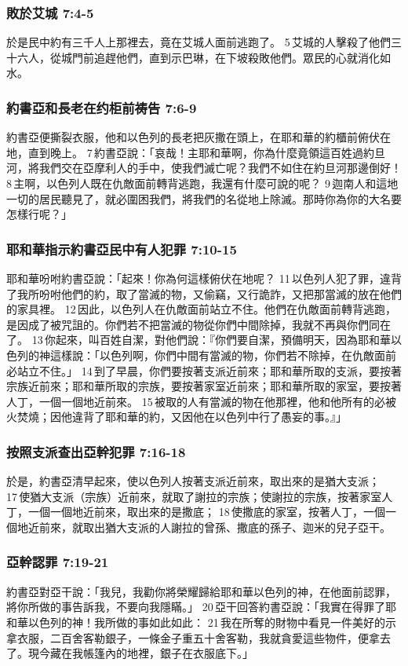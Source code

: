 \subsubsection{敗於艾城 7:4-5}
於是民中約有三千人上那裡去，竟在艾城人面前逃跑了。 5 艾城的人擊殺了他們三十六人，從城門前追趕他們，直到示巴琳，在下坡殺敗他們。眾民的心就消化如水。

\subsubsection{約書亞和長老在约柜前祷告 7:6-9}
約書亞便撕裂衣服，他和以色列的長老把灰撒在頭上，在耶和華的約櫃前俯伏在地，直到晚上。 7 約書亞說：「哀哉！主耶和華啊，你為什麼竟領這百姓過約旦河，將我們交在亞摩利人的手中，使我們滅亡呢？我們不如住在約旦河那邊倒好！ 8 主啊，以色列人既在仇敵面前轉背逃跑，我還有什麼可說的呢？ 9 迦南人和這地一切的居民聽見了，就必圍困我們，將我們的名從地上除滅。那時你為你的大名要怎樣行呢？」

\subsubsection{耶和華指示約書亞民中有人犯罪 7:10-15}
耶和華吩咐約書亞說：「起來！你為何這樣俯伏在地呢？ 11 以色列人犯了罪，違背了我所吩咐他們的約，取了當滅的物，又偷竊，又行詭詐，又把那當滅的放在他們的家具裡。 12 因此，以色列人在仇敵面前站立不住。他們在仇敵面前轉背逃跑，是因成了被咒詛的。你們若不把當滅的物從你們中間除掉，我就不再與你們同在了。 13 你起來，叫百姓自潔，對他們說：『你們要自潔，預備明天，因為耶和華以色列的神這樣說：「以色列啊，你們中間有當滅的物，你們若不除掉，在仇敵面前必站立不住。」 14 到了早晨，你們要按著支派近前來；耶和華所取的支派，要按著宗族近前來；耶和華所取的宗族，要按著家室近前來；耶和華所取的家室，要按著人丁，一個一個地近前來。 15 被取的人有當滅的物在他那裡，他和他所有的必被火焚燒；因他違背了耶和華的約，又因他在以色列中行了愚妄的事。』」


\subsubsection{按照支派查出亞幹犯罪 7:16-18}
於是，約書亞清早起來，使以色列人按著支派近前來，取出來的是猶大支派； 17 使猶大支派（宗族）近前來，就取了謝拉的宗族；使謝拉的宗族，按著家室人丁，一個一個地近前來，取出來的是撒底； 18 使撒底的家室，按著人丁，一個一個地近前來，就取出猶大支派的人謝拉的曾孫、撒底的孫子、迦米的兒子亞干。

\subsubsection{亞幹認罪 7:19-21}
約書亞對亞干說：「我兒，我勸你將榮耀歸給耶和華以色列的神，在他面前認罪，將你所做的事告訴我，不要向我隱瞞。」 20 亞干回答約書亞說：「我實在得罪了耶和華以色列的神！我所做的事如此如此： 21 我在所奪的財物中看見一件美好的示拿衣服，二百舍客勒銀子，一條金子重五十舍客勒，我就貪愛這些物件，便拿去了。現今藏在我帳篷內的地裡，銀子在衣服底下。」

